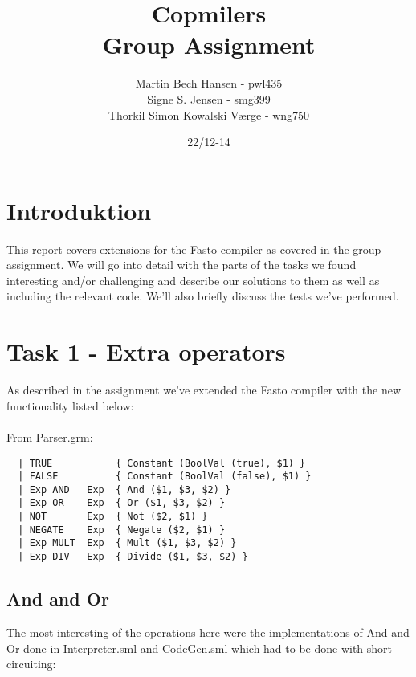 \documentclass{article}
\begin{document}
		


\title{Copmilers\\Group Assignment}
\author{Martin Bech Hansen - pwl435\\Signe S. Jensen - smg399\\Thorkil Simon Kowalski Værge - wng750}

\date{22/12-14}

\maketitle
\newpage

\tableofcontents

\newpage

\section{Introduktion}
This report covers extensions for the Fasto compiler as covered in the group assignment. We will go into detail with the parts of the tasks we found interesting and/or challenging and describe our solutions to them as well as including the relevant code. We'll also briefly discuss the tests we've performed.

\section{Task 1 - Extra operators}

As described in the assignment we've extended the Fasto compiler with the new functionality listed below:\\
\\
From Parser.grm:
\begin{verbatim}
  | TRUE           { Constant (BoolVal (true), $1) }
  | FALSE          { Constant (BoolVal (false), $1) }
  | Exp AND   Exp  { And ($1, $3, $2) }
  | Exp OR    Exp  { Or ($1, $3, $2) }
  | NOT       Exp  { Not ($2, $1) }
  | NEGATE    Exp  { Negate ($2, $1) }
  | Exp MULT  Exp  { Mult ($1, $3, $2) }
  | Exp DIV   Exp  { Divide ($1, $3, $2) }
\end{verbatim}

\subsection{And and Or}
The most interesting of the operations here were the implementations of And and Or done in Interpreter.sml and CodeGen.sml
which had to be done with short-circuiting:
\end{document}
